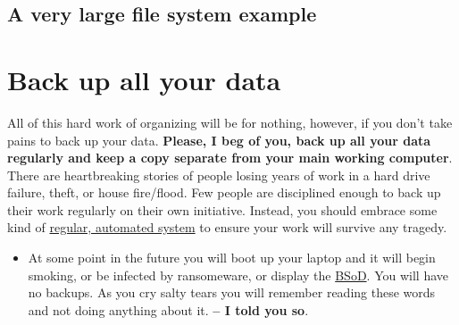 \subsection{A very large file system example}

{\large
{}  
}

\section{Back up all your data}

All of this hard work of organizing will be for nothing, however, if you don't take pains to back up your data. \textbf{Please, I beg of you, back up all your data regularly and keep a copy separate from your main working computer}. There are heartbreaking stories of people losing years of work in a hard drive failure, theft, or house fire/flood. Few people are disciplined enough to back up their work regularly on their own initiative. Instead, you should embrace some kind of \href{https://www.jwz.org/blog/2007/09/psa-backups/}{regular, automated system} to ensure your work will survive any tragedy. 

\begin{itemize}
\item At some point in the future you will boot up your laptop and it will begin smoking, or be infected by ransomeware, or display the \href{https://en.wikipedia.org/wiki/Blue_Screen_of_Death}{BSoD}. You will have no backups. As you cry salty tears you will remember reading these words and not doing anything about it. \textbf{ -- I told you so}.
\end{itemize}